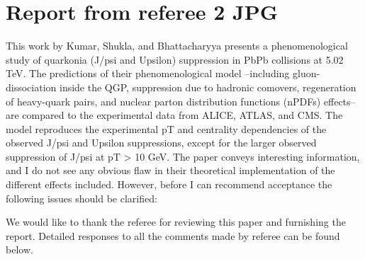 \documentclass[a4paper,11pt]{article}
\begin{document}
\selectfont


\section*{Report from referee 2 JPG}

This work by Kumar, Shukla, and Bhattacharyya presents a phenomenological study of 
quarkonia (J/psi and Upsilon) suppression in PbPb collisions at  5.02 TeV. 
The predictions of their phenomenological model --including gluon-dissociation 
inside the QGP, suppression due to hadronic comovers, regeneration of heavy-quark 
pairs, and nuclear parton distribution functions (nPDFs) effects-- are compared 
to the experimental data from ALICE, ATLAS, and CMS. The model reproduces the 
experimental pT and centrality dependencies of the observed J/psi and Upsilon 
suppressions, except for the larger observed suppression of J/psi at pT > 10 GeV. 
The paper conveys interesting information, and I do not see any obvious flaw in 
their theoretical implementation of the different effects included. However, 
before I can recommend acceptance the following issues should be clarified:
\newline




{\color{blue}
We would like to thank the referee for reviewing this paper and furnishing the report.
Detailed responses to all the comments made by referee can be found below.}
\end{document}
